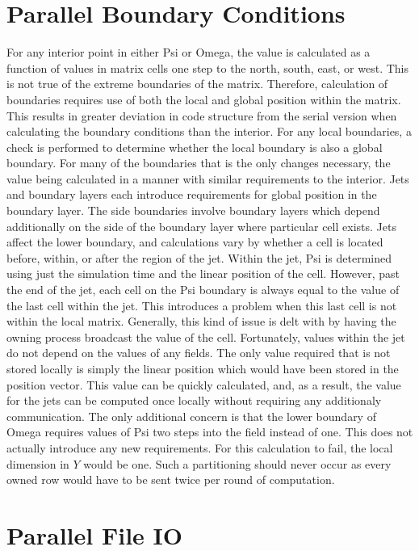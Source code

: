 \documentclass[twocolumn]{article}
\begin{document}
\section{Parallel Boundary Conditions}
For any interior point in either Psi or Omega, the value is calculated
as a function of values in matrix cells one step to the north, south, east, or
west. This is not true of the extreme boundaries of the matrix. Therefore,
calculation of boundaries requires use of both the local and global position
within the matrix. This results in greater deviation in code structure from
the serial version when calculating the boundary conditions than the interior.
For any local boundaries, a check is performed to determine whether the
local boundary is also a global boundary. For many of the boundaries
that is the only changes necessary, the value being calculated in a manner
with similar requirements to the interior. Jets and boundary layers each
introduce requirements for global position in the boundary layer.
The side boundaries involve boundary layers which depend additionally
on the side of the boundary layer where particular cell exists. Jets affect
the lower boundary, and calculations vary by whether a cell is located
before, within, or after the region of the jet. Within the jet, Psi
is determined using just the simulation time and the linear position
of the cell. However, past the end of the jet, each cell on the Psi
boundary is always equal to the value of the last cell within the jet.
This introduces a problem when this last cell is not within the local
matrix. Generally, this kind of issue is delt with by having the
owning process broadcast the value of the cell. Fortunately, values
within the jet do not depend on the values of any fields. The only
value required that is not stored locally is simply the linear position
which would have been stored in the position vector. This value can
be quickly calculated, and, as a result, the value for the jets can be
computed once locally without requiring any additionaly communication.
The only additional concern is that the lower boundary of Omega requires
values of Psi two steps into the field instead of one. This does not
actually introduce any new requirements. For this calculation to fail,
the local dimension in $Y$ would be one. Such a partitioning should
never occur as every owned row would have to be sent twice per round
of computation.

\section{Parallel File IO}
\end{document}
